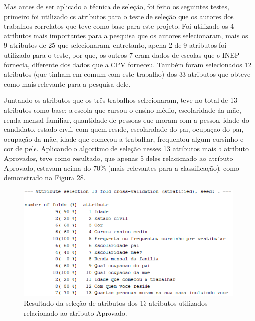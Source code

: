 \par
Mas antes de ser aplicado a técnica de seleção, foi feito os seguintes testes, primeiro foi utilizado os atributos para o teste de seleção que os autores dos trabalhos correlatos que teve como base para este projeto. Foi utilizado os 4 atributos mais importantes para a pesquisa que os autores  selecionaram, mais os 9 atributos de 25 que  selecionaram, entretanto, apena 2 de 9 atributos foi utilizado para o teste, por que, os outros 7 eram dados de escolas que o INEP fornecia, diferente dos dados que a CPV forneceu. Também foram selecionados 12 atributos (que tinham em comum com este trabalho) dos 33 atributos que  obteve como mais relevante para a pesquisa dele.


\par
Juntando os atributos que os três trabalhos selecionaram, teve no total de 13 atributos como base: a escola que cursou o ensino médio, escolaridade da mãe, renda mensal familiar, quantidade de pessoas que moram com a pessoa, idade do candidato, estado civil, com quem reside, escolaridade do pai, ocupação do pai, ocupação da mãe, idade que começou a trabalhar, frequentou algum cursinho e cor de pele. Aplicando o algoritmo de seleção nesses 13 atributos mais o atributo Aprovados, teve como resultado, que apenas 5 deles relacionado ao atributo Aprovado, estavam acima do 70\%  (mais relevantes para a classificação), como demonstrado na Figura 28.


\par
\begin{figure}[!htp]
	\begin{center}
    \caption{\label{fig:waveform_fig} Resultado da seleção de atributos dos 13 atributos utilizados relacionado ao atributo Aprovado.}
	\includegraphics[scale=0.99]{Figuras/13_atributos.png}
	\end{center}
\end{figure}

